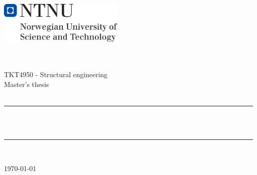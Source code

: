 \begin{titlepage}
\begin{center}
\includegraphics[height=2cm]{images/NTNU_hovedlogo_eng.png}\\[1cm]   
\end{center}
\begin{center}

 ~\\[1.5cm]

\textsc{\Large }\\[0.5cm] TKT4950 - Structural engineering \\ Master's thesis\\

 ~\\[.1cm]

\hrule ~\\[0.4cm]
{\huge \bfseries \mytitle}~\\[0.4cm]
\hrule ~\\[1.5cm]

\begin{minipage}{0.4\textwidth}
    \centering
	\large
	\myauthor
\end{minipage}

\vfill

{\large \today}

\end{center}
\end{titlepage}